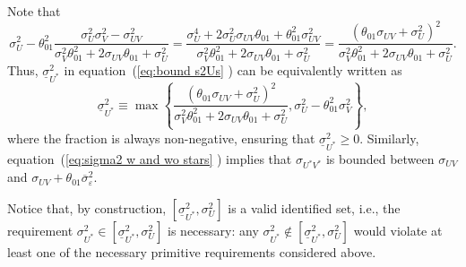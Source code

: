 \documentclass[12pt]{article}
\begin{document}
\begin{appendices}
Note that%
\begin{equation*}
\sigma _{U}^{2}-\theta _{01}^{2}\frac{\sigma _{U}^{2}\sigma _{V}^{2}-\sigma
_{UV}^{2}}{\sigma _{V}^{2}\theta _{01}^{2}+2\sigma _{UV}\theta _{01}+\sigma
_{U}^{2}}=\frac{\sigma _{U}^{4}+2\sigma _{U}^{2}\sigma _{UV}\theta
_{01}+\theta _{01}^{2}\sigma _{UV}^{2}}{\sigma _{V}^{2}\theta
_{01}^{2}+2\sigma _{UV}\theta _{01}+\sigma _{U}^{2}}=\frac{\left( \theta
_{01}\sigma _{UV}+\sigma _{U}^{2}\right) ^{2}}{\sigma _{V}^{2}\theta
_{01}^{2}+2\sigma _{UV}\theta _{01}+\sigma _{U}^{2}}.
\end{equation*}%
Thus, $\underline{\sigma }_{U^{\ast }}^{2}$ in equation~(\ref{eq:bound s2Us}%
) can be equivalently written as%
\begin{equation*}
\underline{\sigma }_{U^{\ast }}^{2}\equiv \max \left\{ \frac{\left( \theta
_{01}\sigma _{UV}+\sigma _{U}^{2}\right) ^{2}}{\sigma _{V}^{2}\theta
_{01}^{2}+2\sigma _{UV}\theta _{01}+\sigma _{U}^{2}},\sigma _{U}^{2}-\theta
_{01}^{2}\sigma _{V}^{2}\right\} ,
\end{equation*}%
where the fraction is always non-negative, ensuring that $\underline{\sigma }%
_{U^{\ast }}^{2}\geq 0$. Similarly, equation~(\ref{eq:sigma2 w and wo stars}%
) implies that $\sigma _{U^{\ast }V^{\ast }}$ is bounded between $\sigma
_{UV}$ and $\sigma _{UV}+\theta _{01}\overline{\sigma }_{\varepsilon }^{2}$.

Notice that, by construction, $\left[ \underline{\sigma }_{U^{\ast
}}^{2},\sigma _{U}^{2}\right]$ is a valid identified set, i.e., the
requirement $\sigma_{U^*}^2 \in \left[ \underline{\sigma }_{U^{\ast
}}^{2},\sigma _{U}^{2}\right]$ is necessary: any $\sigma_{U^*}^2 \notin %
\left[ \underline{\sigma }_{U^{\ast }}^{2},\sigma _{U}^{2}\right]$ would
violate at least one of the necessary primitive requirements considered
above.


\end{appendices}
\end{document}

